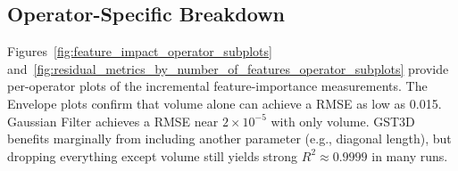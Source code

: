 \subsection{Operator-Specific Breakdown}
\label{subsec:operator-specific-breakdown}

Figures~\ref{fig:feature_impact_operator_subplots} and~\ref{fig:residual_metrics_by_number_of_features_operator_subplots} provide per-operator plots of the incremental feature-importance measurements.
The Envelope plots confirm that volume alone can achieve a \ac{RMSE} as low as 0.015.
Gaussian Filter achieves a \ac{RMSE} near \(2\times10^{-5}\) with only volume.
\ac{GST3D} benefits marginally from including another parameter (e.g., diagonal length), but dropping everything except  volume  still yields strong $R^2 \approx 0.9999$ in many runs.

